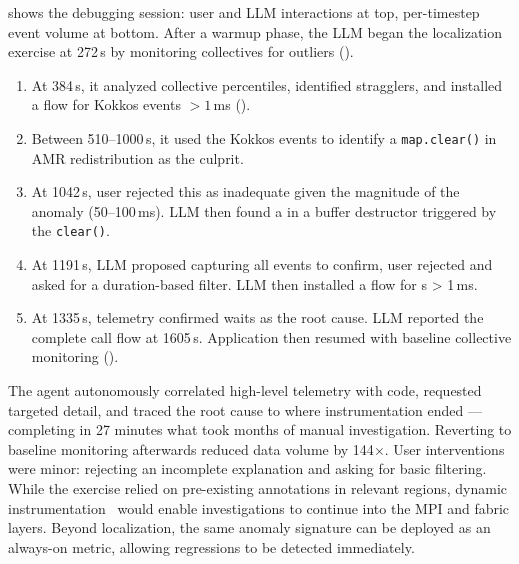  shows the debugging session: user and LLM interactions at top,
per-timestep event volume at bottom.
After a warmup phase, the LLM began the localization exercise at 272\,s by monitoring collectives
for outliers ().

\begin{enumerate}[leftmargin=*]
  \item At 384\,s, it analyzed collective percentiles, identified stragglers,
        and installed a flow for Kokkos events $> 1$\,ms ().
  \item Between 510--1000\,s, it used the Kokkos events to identify a \texttt{map.clear()} in AMR redistribution as the culprit.
  \item At 1042\,s, user rejected this as inadequate given the magnitude of the anomaly (50--100\,ms).
        LLM then found a \mpiw{} in a buffer destructor triggered by the \texttt{clear()}.
  \item At 1191\,s, LLM proposed capturing all \mpiw{} events to confirm, user rejected and asked for a duration-based filter.
        LLM then installed a flow for \mpiw{}s \textgreater{} 1\,ms.
  \item At 1335\,s, telemetry confirmed waits as the root cause.
        LLM reported the complete call flow at 1605\,s.
        Application then resumed with baseline collective monitoring ().
\end{enumerate}

The agent autonomously correlated high-level telemetry with code, requested targeted detail, and
traced the root cause to where instrumentation ended --- completing in 27 minutes what took months
of manual investigation.
Reverting to baseline monitoring afterwards reduced data volume by 144$\times$.
User interventions were minor: rejecting an incomplete explanation and asking for basic filtering.
While the exercise relied on pre-existing annotations in relevant regions, dynamic
instrumentation~\cite{:eBPF, Berna2011:DynInst} would enable investigations to continue into the
MPI and fabric layers.
Beyond localization, the same anomaly signature can be deployed as an always-on metric, allowing
regressions to be detected immediately.

